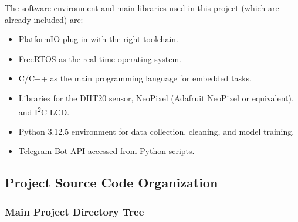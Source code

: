 The software environment and main libraries used in this project (which are already included) are:

\begin{itemize}
  \item PlatformIO plug-in with the right toolchain.
  \item FreeRTOS as the real-time operating system.
  \item C/C++ as the main programming language for embedded tasks.
  \item Libraries for the DHT20 sensor, NeoPixel (Adafruit NeoPixel or equivalent), and I\textsuperscript{2}C LCD.
  \item Python  3.12.5 environment for data collection, cleaning, and model training.
  \item Telegram Bot API accessed from Python scripts.
\end{itemize}


\newpage
\subsection{Project Source Code Organization}

\subsubsection{Main Project Directory Tree}

